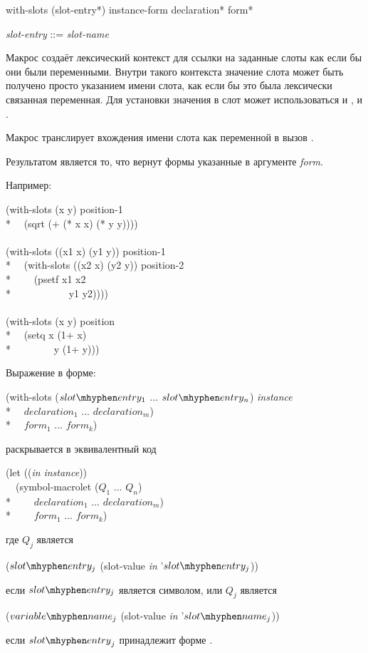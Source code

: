 \begin{defmac}
with-slots ({slot-entry}*) instance-form {declaration}* {form}*

\begin{tabbing}
\emph{slot-entry} ::= \emph{slot-name} {\Mor} 
\end{tabbing}
Макрос  создаёт лексический контекст для ссылки на заданные
слоты как если бы они были переменными. Внутри такого контекста значение слота
может быть получено просто указанием имени слота, как если бы это была
лексически связанная переменная. Для установки значения в слот может
использоваться и , и .

Макрос  транслирует вхождения имени слота как переменной в вызов
.

Результатом является то, что вернут формы указанные в аргументе \emph{form}.

Например:

\begin{lisp}
(with-slots (x y) position-1 \\*
~~(sqrt (+ (* x x) (* y y)))) \\
\\
(with-slots ((x1 x) (y1 y)) position-1 \\*
~~(with-slots ((x2 x) (y2 y)) position-2 \\*
~~~~(psetf x1 x2 \\*
~~~~~~~~~~~y1 y2)))) \\
\\
(with-slots (x y) position \\*
~~(setq x (1+ x) \\*
~~~~~~~~y (1+ y)))
\end{lisp}

Выражение  в форме:
\begin{lisp}
(with-slots ($slot\mhyphen entry_{1}$ ... $slot\mhyphen entry_{n}$) \emph{instance} \\*
~~$declaration_1$ ... $declaration_{m}$) \\*
~~$form_1$ ... $form_{k}$)
\end{lisp}
раскрывается в эквивалентный код
\begin{lisp}
(let ((\emph{in} \emph{instance})) \\
~~(symbol-macrolet ($Q_1$ ... $Q_{n}$) \\*
~~~~$declaration_1$ ... $declaration_{m}$) \\*
~~~~$form_1$ ... $form_{k}$)
\end{lisp}
где ${Q}_{j}$ является
\begin{lisp}
($slot\mhyphen entry_{j}$ (slot-value \emph{in} '$slot\mhyphen entry_{j}$))
\end{lisp}
если $slot\mhyphen entry_{j}$ является символом, или ${Q}_{j}$ является
\begin{lisp}
($variable\mhyphen name_{j}$ (slot-value \emph{in} '$slot\mhyphen name_{j}$))
\end{lisp}
если ${slot\mhyphen entry}_{j}$ принадлежит форме .


\end{defmac}
